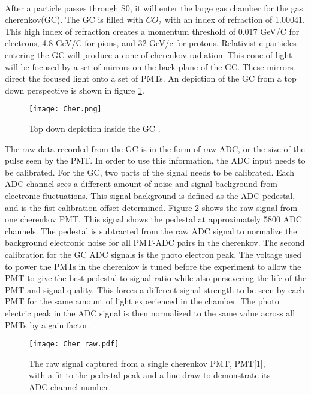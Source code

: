 	\paragraph{}After a particle passes through S0, it will enter the large gas chamber for the gas cherenkov(GC). The GC is filled with $CO_2$ with an index of refraction of 1.00041. This high index of refraction creates a momentum threshold of 0.017 GeV/C for electrons, 4.8 GeV/C for pions, and 32 GeV/c for protons\cite{GasC}. Relativistic particles entering the GC will produce a cone of cherenkov radiation. This cone of light will be focused by a set of mirrors on the back plane of the GC. These mirrors direct the focused light onto a set of PMTs. An depiction of the GC from a top down perspective is shown in figure \ref{fig:cer_TD}. 
	\begin{figure}[h]
		\centering
		\texttt{[image: Cher.png]}
		\caption{Top down depiction inside the GC \cite{GasC}.}
		\label{fig:cer_TD}
	\end{figure}
	The raw data recorded from the GC is in the form of raw ADC, or the size of the pulse seen by the PMT. In order to use this information, the ADC input needs to be calibrated. For the GC, two parts of the signal needs to be calibrated. Each ADC channel sees a different amount of noise and signal background from electronic fluctuations. This signal background is defined as the ADC pedestal, and is the fist calibration offset determined. Figure \ref{fig:cer_raw} shows the raw signal from one cherenkov PMT. This signal shows the pedestal at approximately 5800 ADC channels. The pedestal is subtracted from the raw ADC signal to normalize the background electronic noise for all PMT-ADC pairs in the cherenkov. The second calibration for the GC ADC signals is the photo electron peak. The voltage used to power the PMTs in the cherenkov is tuned before the experiment to allow the PMT to give the best pedestal to signal ratio while also persevering the life of the PMT and signal quality. This forces a different signal strength to be seen by each PMT for the same amount of light experienced in the chamber. The photo electric peak in the ADC signal is then normalized to the same value across all PMTs by a gain factor. 
	\begin{figure}[h]
		\centering
		\texttt{[image: Cher\_raw.pdf]}
		\caption{The raw signal captured from a single cherenkov PMT, PMT[1], with a fit to the pedestal peak and a line draw to demonstrate its ADC channel number.}
		\label{fig:cer_raw}
	\end{figure}
